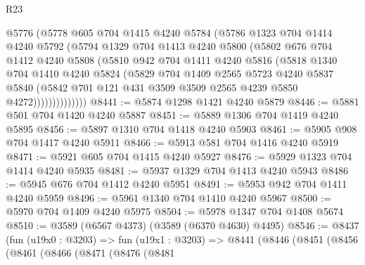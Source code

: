 \begin{lexlean}{R23}
\begin{coremodule}
                @5776
                (@5778
                  @605
                  @704
                  @1415
                  @4240
                  @5784
                  (@5786
                    @1323
                    @704
                    @1414
                    @4240
                    @5792
                    (@5794
                      @1329
                      @704
                      @1413
                      @4240
                      @5800
                      (@5802
                        @676
                        @704
                        @1412
                        @4240
                        @5808
                        (@5810
                          @942
                          @704
                          @1411
                          @4240
                          @5816
                          (@5818
                            @1340
                            @704
                            @1410
                            @4240
                            @5824
                            (@5829
                              @704
                              @1409
                              @2565
                              @5723
                              @4240
                              @5837
                              @5840
                              (@5842
                                @701
                                @121
                                @431
                                @3509
                                @3509
                                @2565
                                @4239
                                @5850
                                @4272))))))))))))))
@8441 := @5874 @1298 @1421 @4240 @5879
@8446 := @5881 @501 @704 @1420 @4240 @5887
@8451 := @5889 @1306 @704 @1419 @4240 @5895
@8456 := @5897 @1310 @704 @1418 @4240 @5903
@8461 := @5905 @908 @704 @1417 @4240 @5911
@8466 := @5913 @581 @704 @1416 @4240 @5919
@8471 := @5921 @605 @704 @1415 @4240 @5927
@8476 := @5929 @1323 @704 @1414 @4240 @5935
@8481 := @5937 @1329 @704 @1413 @4240 @5943
@8486 := @5945 @676 @704 @1412 @4240 @5951
@8491 := @5953 @942 @704 @1411 @4240 @5959
@8496 := @5961 @1340 @704 @1410 @4240 @5967
@8500 := @5970 @704 @1409 @4240 @5975
@8504 := @5978 @1347 @704 @1408 @5674
@8510 := @3589 (@6567 @4373) (@3589 (@6370 @4630) @4495)
@8546 := @8437
    (fun (u19x0 : @3203) =>
    fun (u19x1 : @3203) =>
    @8441
      (@8446
        (@8451
          (@8456
            (@8461
              (@8466
                (@8471
                  (@8476
                    (@8481

\end{coremodule}
\end{lexlean}

